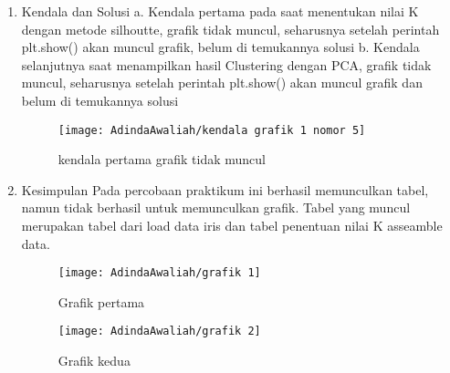 \begin{enumerate}
\item Kendala dan Solusi
\newline a. Kendala pertama pada saat menentukan nilai K 		dengan metode silhoutte, grafik tidak muncul, seharusnya setelah perintah plt.show() akan muncul grafik, belum di temukannya solusi
\newline b. Kendala selanjutnya saat menampilkan hasil Clustering dengan PCA, grafik tidak muncul, seharusnya setelah perintah plt.show() akan muncul grafik dan belum di temukannya solusi

\begin{figure}[!ht]
\texttt{[image: AdindaAwaliah/kendala grafik 1 nomor 5]}
\caption{kendala pertama grafik tidak muncul}
\label{gam:kendala grafik 1 nomor 5}
\end{figure}


\item Kesimpulan
\newline Pada percobaan praktikum ini berhasil memunculkan tabel, namun tidak berhasil untuk memunculkan grafik. Tabel yang muncul merupakan tabel dari load data iris dan tabel penentuan nilai K asseamble data.

\begin{figure}[!ht]
\texttt{[image: AdindaAwaliah/grafik 1]}
\caption{Grafik pertama }
\label{gam:grafik 1}
\end{figure}

\begin{figure}[!ht]
\texttt{[image: AdindaAwaliah/grafik 2]}
\caption{Grafik kedua }
\label{gam:grafik 2}
\end{figure}

\end{enumerate}
